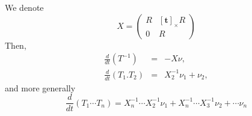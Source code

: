 \documentclass {article}
\newcommand\transf{T}
\newcommand\transl{\mathbf{t}}
\newcommand\cross[1]{\left[#1\right]_{\times}}
\begin{document}
We denote
$$
X = \left(\begin{array}{cc}R&\cross{\transl}R\\0&R\end{array}\right)
$$
Then,
\begin{eqnarray}
  \label{eq:derivative-inverse}
  \frac{d}{dt}(\transf^{-1}) &=& -X\nu,\\
  \frac{d}{dt}(\transf_1.\transf_2) &=&X_2^{-1}\nu_1+\nu_2,
\end{eqnarray}
and more generally
\begin{equation}\label{eq:derivative-product}
\frac{d}{dt}(\transf_1\cdots\transf_n) = X_n^{-1}\cdots X_2^{-1}\nu_1 + X_n^{-1}\cdots X_3^{-1}\nu_2 + \cdots \nu_n
\end{equation}
\end{document}
